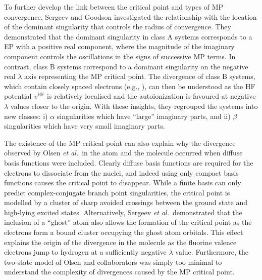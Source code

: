 \documentclass[aps,prb,reprint,noshowkeys,superscriptaddress]{revtex4-1}
\newcommand{\latin}[1]{#1}
\newcommand{\eg}{\latin{e.g.}}
\newcommand{\etal}{\textit{et al.}}
\begin{document}
To further develop the link between the critical point and types of MP convergence, Sergeev and Goodson investigated
the relationship with the location of the dominant singularity that controls the radius of convergence.\cite{Goodson_2004}
They demonstrated that the dominant singularity in class A systems corresponds to a EP with a positive real component, 
where the magnitude of the imaginary component controls the oscillations in the signs of successive MP 
terms.\cite{Goodson_2000a,Goodson_2000b}
In contrast, class B systems correspond to a dominant singularity on the negative real $\lambda$ axis representing
the MP critical point.
The divergence of class B systems, which contain closely spaced electrons (\eg, ), can then be understood as the 
HF potential $v^{\text{HF}}$ is relatively localised and the autoionization is favoured at negative 
$\lambda$ values closer to the origin.
With these insights, they regrouped the systems into new classes: i) $\alpha$ singularities which have ``large'' imaginary parts, 
and ii) $\beta$ singularities which have very small imaginary parts.\cite{Goodson_2004,Sergeev_2006} 

The existence of the MP critical point can also explain why the divergence observed by Olsen \etal\ in the  atom 
and the  molecule occurred when diffuse basis functions were included.\cite{Olsen_1996}
Clearly diffuse basis functions are required for the electrons to dissociate from the nuclei, and indeed using
only compact basis functions causes the critical point to disappear.
While a finite basis can only predict complex-conjugate branch point singularities, the critical point is modelled
by a cluster of sharp avoided crossings between the ground state and high-lying excited states.\cite{Sergeev_2005}
Alternatively, Sergeev \etal\ demonstrated that the inclusion of a ``ghost'' atom also
allows the formation of the critical point as the electrons form a bound cluster occupying the ghost atom orbitals.\cite{Sergeev_2005}
This effect explains the origin of the divergence in the  molecule as the fluorine valence electrons jump to hydrogen at
 a sufficiently negative $\lambda$ value.\cite{Sergeev_2005}
Furthermore, the two-state model of Olsen and collaborators \cite{Olsen_2000} was simply too minimal to understand the complexity of 
divergences caused by the MP critical point.
\end{document}
